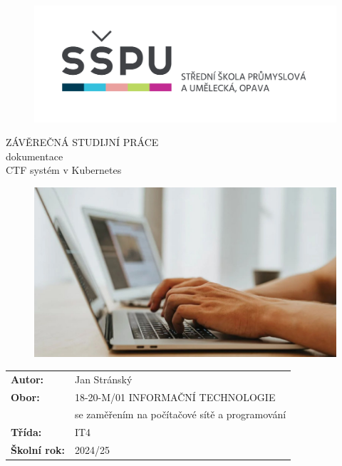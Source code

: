 \documentclass[12pt, a4paper,
twoside,        %
openright
]{report}
\title{\nazevPrace} %
\author{\jmenoAutora} %
\date{\datumOdevzdani} %
\newcommand\obor{INFORMAČNÍ TECHNOLOGIE} %
\newcommand\kodOboru{18-20-M/01} %
\newcommand\zamereni{se zaměřením na počítačové sítě a programování} %
\newcommand\trida{IT4} %
\newcommand\jmenoAutora{Jan Stránský}  %
\newcommand\skolniRok{2024/25} %
\newcommand\nazevPrace{CTF systém v Kubernetes} %
\begin{document}
	
	\pagestyle{empty}
	
	\cleardoublepage

	
	{\selectfont
		\begin{figure}[h]
			\centering
			\includegraphics[width=0.6\linewidth]{image/logo-skoly.png} 
		\end{figure}
		
		
		{\bfseries %
			\begin{center}
				\vspace{0.025 \textheight}
				\LARGE{ZÁVĚREČNÁ STUDIJNÍ PRÁCE}\\
				\large{dokumentace}\\
				\vspace{0.075 \textheight}
				\LARGE {\nazevPrace}\\
			\end{center}  
		}%
		
		\begin{figure}[h]
			\centering
			\includegraphics[width=0.8\linewidth]{image/programovani-02.jpg} 
		\end{figure}
		
		\vspace{0.02 \textheight}
		\begin{table}[h!]
			\begin{tabular}{ll}
				\textbf{Autor:} & \jmenoAutora\\ 
				\textbf{Obor:} & \kodOboru { } \obor\\
				\textbf{} & \zamereni\\
				\textbf{Třída:} & \trida\\
				\textbf{Školní rok:} & \skolniRok\\
			\end{tabular}
			
		\end{table}		
	}
	
\end{document}
